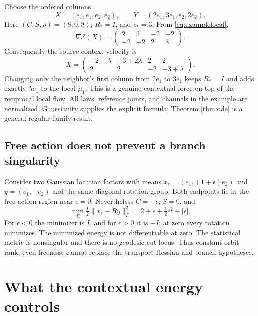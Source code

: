 \documentclass[11pt]{article}
\begin{document}
Choose the ordered columns
\begin{equation}
 X=(e_1,e_1,e_2,e_2),\qquad
 Y=(2e_1,3e_1,e_2,2e_2).
\end{equation}
Here $(C,S,\rho)=(8,0,8)$, $R_*=I$, and $c_*=3$. From \eqref{eq:examplelocal},
\begin{equation}
 \nabla\mathcal E(X)=
 \begin{pmatrix}2&3&-2&-2\\-2&-2&2&3\end{pmatrix}.
\end{equation}
Consequently the source-context velocity is
\begin{equation}
 \dot X=
 \begin{pmatrix}
 -2+\lambda&-3+2\lambda&2&2\\
 2&2&-2&-3+\lambda
 \end{pmatrix}.
 \label{eq:witnessvelocity}
\end{equation}
Changing only the neighbor's first column from $2e_1$ to $3e_1$ keeps $R_*=I$ and adds exactly $\lambda e_1$ to the local $\dot\mu_1$. This is a genuine contextual force on top of the reciprocal local flow. All laws, reference joints, and channels in the example are normalized. Gaussianity supplies the explicit formula; Theorem \ref{thm:ode} is a general regular-family result.

\subsection{Free action does not prevent a branch singularity}

Consider two Gaussian location factors with means
$x_\epsilon=(e_1,(1+\epsilon)e_2)$ and $y=(e_1,-e_2)$ and the same diagonal rotation group. Both endpoints lie in the free-action region near $\epsilon=0$. Nevertheless $C=-\epsilon$, $S=0$, and
\begin{equation}
 \min_R\tfrac12\|x_\epsilon-Ry\|_F^2
 =2+\epsilon+\tfrac12\epsilon^2-|\epsilon|.
 \label{eq:cusp}
\end{equation}
For $\epsilon<0$ the minimizer is $I$, and for $\epsilon>0$ it is $-I$; at zero every rotation minimizes. The minimized energy is not differentiable at zero. The statistical metric is nonsingular and there is no geodesic cut locus. Thus constant orbit rank, even freeness, cannot replace the transport Hessian and branch hypotheses.

\section{What the contextual energy controls}
\end{document}
